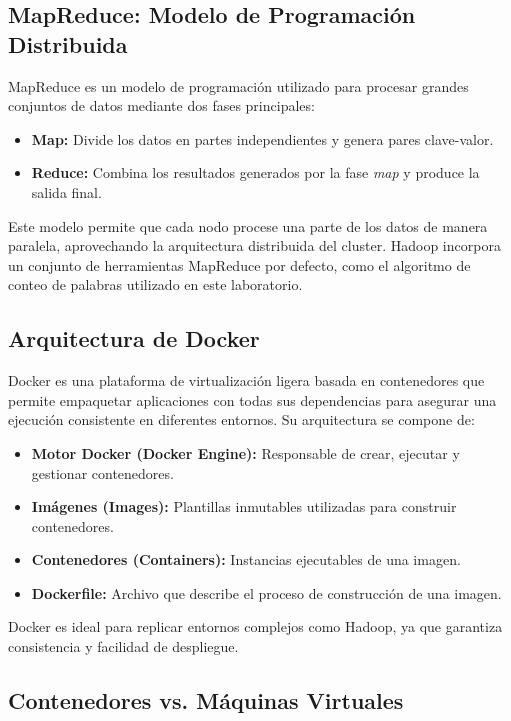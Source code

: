 \subsection{MapReduce: Modelo de Programación Distribuida}

MapReduce es un modelo de programación utilizado para procesar grandes conjuntos de datos mediante dos fases principales:

\begin{itemize}
    \item \textbf{Map:} Divide los datos en partes independientes y genera pares clave-valor.
    \item \textbf{Reduce:} Combina los resultados generados por la fase \textit{map} y produce la salida final.
\end{itemize}

Este modelo permite que cada nodo procese una parte de los datos de manera paralela, aprovechando la arquitectura distribuida del cluster. Hadoop incorpora un conjunto de herramientas MapReduce por defecto, como el algoritmo de conteo de palabras utilizado en este laboratorio.

\subsection{Arquitectura de Docker}

Docker es una plataforma de virtualización ligera basada en contenedores que permite empaquetar aplicaciones con todas sus dependencias para asegurar una ejecución consistente en diferentes entornos. Su arquitectura se compone de:

\begin{itemize}
    \item \textbf{Motor Docker (Docker Engine):} Responsable de crear, ejecutar y gestionar contenedores.
    \item \textbf{Imágenes (Images):} Plantillas inmutables utilizadas para construir contenedores.
    \item \textbf{Contenedores (Containers):} Instancias ejecutables de una imagen.
    \item \textbf{Dockerfile:} Archivo que describe el proceso de construcción de una imagen.
\end{itemize}

Docker es ideal para replicar entornos complejos como Hadoop, ya que garantiza consistencia y facilidad de despliegue.

\subsection{Contenedores vs. Máquinas Virtuales}

